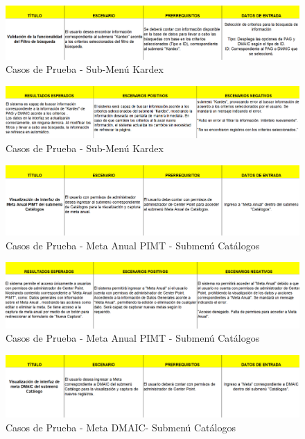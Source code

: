 \documentclass[12pt,letterpaper,spanish, xcolor=table]{report}
\numberwithin{figure}{subsection}
\begin{document}
	\begin{figure}[H]
		\centering
		\includegraphics[width=1.0\textwidth]
		{Imagenes/CenterPoint/CPKardex.png}
		\caption{Casos de Prueba - Sub-Menú Kardex}\label{a3}
	\end{figure}
	
	\begin{figure}[H]
		\centering
		\includegraphics[width=1.0\textwidth]
		{Imagenes/CenterPoint/CPKardex2.png}
		\caption{Casos de Prueba - Sub-Menú Kardex}\label{a3}
	\end{figure}
	
	\begin{figure}[H]
		\centering
		\includegraphics[width=1.0\textwidth]
		{Imagenes/CenterPoint/CPPIMTC.png}
		\caption{Casos de Prueba - Meta Anual PIMT - Submenú Catálogos}\label{a3}
	\end{figure}
	
	\begin{figure}[H]
		\centering
		\includegraphics[width=1.0\textwidth]
		{Imagenes/CenterPoint/CPPIMTC2.png}
		\caption{Casos de Prueba - Meta Anual PIMT - Submenú Catálogos}\label{a3}
	\end{figure}
	
	\begin{figure}[H]
		\centering
		\includegraphics[width=1.0\textwidth]
		{Imagenes/CenterPoint/CPDMAIC.png}
		\caption{Casos de Prueba - Meta DMAIC- Submenú Catálogos}\label{a3}
	\end{figure}
	
\end{document}
